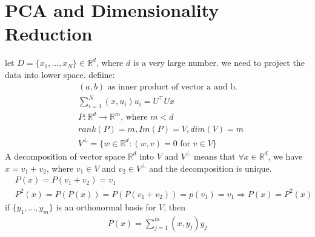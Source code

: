 \documentclass[11pt]{article}
\theoremstyle{plain}
\theoremstyle{definition}
\begin{document}
\section{PCA and Dimensionality Reduction}
let $D = \{ x_1, ..., x_N \} \in \mathbb{R}^d$, where $d$ is a very large number. we need to project the data into lower space. defiine: \begin{align*}
&(a,b) \text{ as inner product of vector a and b.}\\
&\sum\limits_{i=1}^{N} (x, u_i)u_i = U^\top U x \\
&P: \mathbb{R}^d \rightarrow \mathbb{R}^m \text{, where }m<d \\
&rank(P) = m, Im(P) = V, dim(V) = m \\
&V^{\perp} = \{ w \in \mathbb{R}^d : (w,v) = 0 \text{ for } v \in V\}
\end{align*}
A decomposition of vector space $\mathbb{R}^d$ into $V$ and $V^{\perp}$ means that $\forall x \in \mathbb{R}^d$, we have $x = v_1 + v_2$, where $v_1 \in V$ and $v_2 \in V^{\perp}$ and the decomposition is unique. 
\begin{align*}
&P(x) = P(v_1 + v_2) = v_1 \\
&P^2(x)= P(P(x)) = P(P(v_1+v_2)) = p(v_1) = v_1 \Longrightarrow P(x) = P^2(x) 
\end{align*}
if $\{ y_1, ..., y_m \}$ is an orthonormal basis for $V$, then \begin{align*}
P(x) = \sum\limits_{j=1}^{m} (x,y_j)y_j
\end{align*}
\end{document}
